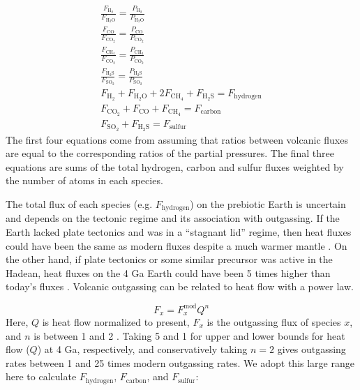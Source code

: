 \begin{gather}
  \frac{F_\mathrm{H_2}}{F_\mathrm{H_2O}} = \frac{P_\mathrm{H_2}}{P_\mathrm{H_2O}} \label{eq:flux_ratios} \\
  \frac{F_\mathrm{CO}}{F_\mathrm{CO_2}} = \frac{P_\mathrm{CO}}{P_\mathrm{CO_2}} \\
  \frac{F_\mathrm{CH_4}}{F_\mathrm{CO_2}} = \frac{P_\mathrm{CH_4}}{P_\mathrm{CO_2}} \\
  \frac{F_\mathrm{H_2S}}{F_\mathrm{SO_2}} = \frac{P_\mathrm{H_2S}}{P_\mathrm{SO_2}} \\
  F_\mathrm{H_2} + F_\mathrm{H_2O} + 2 F_\mathrm{CH_4} + F_\mathrm{H_2S} = F_\mathrm{hydrogen} \\
  F_\mathrm{CO_2} + F_\mathrm{CO} + F_\mathrm{CH_4} = F_\mathrm{carbon} \\
  F_\mathrm{SO_2} + F_\mathrm{H_2S} = F_\mathrm{sulfur} \label{eq:total_sulfur_flux}
\end{gather}
The first four equations come from assuming that ratios between volcanic fluxes are equal to the corresponding ratios of the partial pressures. The final three equations are sums of the total hydrogen, carbon and sulfur fluxes weighted by the number of atoms in each species. 

The total flux of each species (e.g. $F_\mathrm{hydrogen}$) on the prebiotic Earth is uncertain and depends on the tectonic regime and its association with outgassing. If the Earth lacked plate tectonics and was in a ``stagnant lid'' regime, then heat fluxes could have been the same as modern fluxes despite a much warmer mantle \citep{Korenaga_2009}. On the other hand, if plate tectonics or some similar precursor was active in the Hadean, heat fluxes on the 4 Ga Earth could have been 5 times higher than today's fluxes \citep{Sleep_2001}. Volcanic outgassing can be related to heat flow with a power law.

\begin{equation}
  F_x = F_x^\mathrm{mod} Q^n
\end{equation}
Here, $Q$ is heat flow normalized to present, $F_x$ is the outgassing flux of species $x$, and $n$ is between 1 and 2 \citep{KrissansenTotton_2018_carbon}. Taking 5 and 1 for upper and lower bounds for heat flow ($Q$) at 4 Ga, respectively, and conservatively taking $n = 2$ gives outgassing rates between 1 and 25 times modern outgassing rates. We adopt this large range here to calculate $F_\mathrm{hydrogen}$, $F_\mathrm{carbon}$, and $F_\mathrm{sulfur}$:

